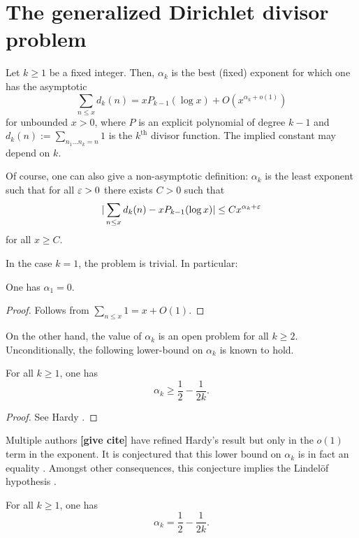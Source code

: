 \chapter{The generalized Dirichlet divisor problem}

\begin{definition}\label{divisor-def} Let $k \geq 1$ be a fixed integer. Then, $\alpha_k$ is the best (fixed) exponent for which one has the asymptotic
$$ \sum_{n \leq x} d_k(n) = x P_{k-1}(\log x) + O(x^{\alpha_k+o(1)})$$
for unbounded $x > 0$, where $P$ is an explicit polynomial of degree $k-1$ and $d_k(n) := \sum_{n_1 \dots n_k=n} 1$ is the $k^{\mathrm{th}}$ divisor function. The implied constant may depend on $k$.
\end{definition}


Of course, one can also give a non-asymptotic definition: $\alpha_k$ is the least exponent such that for all $\varepsilon > 0$ there exists $C > 0$ such that
$$ |\sum_{n \leq x} d_k(n) - x P_{k-1}(\log x)| \leq C x^{\alpha_k + \varepsilon}$$
for all $x \geq C$.

In the case $k = 1$, the problem is trivial. In particular:

\begin{lemma}[$d_1$ exponent]\label{divisor-1} One has $\alpha_1=0$.
\end{lemma}
\begin{proof}
Follows from $\sum_{n \le x}1 = x + O(1)$.
\end{proof}

On the other hand, the value of $\alpha_k$ is an open problem for all $k \ge 2$. Unconditionally, the following lower-bound on $\alpha_k$ is known to hold.

\begin{lemma}\label{divisor-lower}
For all $k \geq 1$, one has
\[
\alpha_k \geq \frac{1}{2} - \frac{1}{2k}.
\]
\end{lemma}
\begin{proof} See Hardy \cite{hardy_divisor_1916}.
\end{proof}

Multiple authors {\bf [give cite]} have refined Hardy's result but only in the $o(1)$ term in the exponent. It is conjectured that this lower bound on $\alpha_k$ is in fact an equality \cite[p.\ 320]{titchmarsh_theory_1986}. Amongst other consequences, this conjecture implies the Lindel\"of hypothesis \cite[Chapter XII]{titchmarsh_theory_1986}.
\begin{conjecture}
For all $k \geq 1$, one has
\[
\alpha_k = \frac{1}{2} - \frac{1}{2k}.
\]
\end{conjecture}

